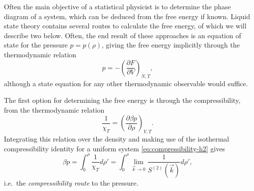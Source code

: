 Often the main objective of a statistical physicist is to determine the phase diagram of a system, which can be deduced from the free energy if known.
Liquid state theory contains several routes to calculate the free energy, of which we will describe two below.
Often, the end result of these approaches is an equation of state for the pressure $p = p(\rho)$, giving the free energy implicitly through the thermodynamic relation
\begin{equation}\label{eq:pressure-relation-1}
  p
  =
  - \left( \frac{\partial F}{\partial V} \right)_{N,T},
\end{equation}
although a state equation for any other thermodynamic observable would suffice.

The first option for determining the free energy is through the compressibility, from the thermodynamic relation
\begin{equation}
  \frac{1}{\chi_T}
  =
  \left( \frac{\partial \beta p}{\partial \rho} \right)_{V,T}.
\end{equation}
Integrating this relation over the density and making use of the isothermal compressibility identity for a uniform system \eqref{eq:compressibility-h2} gives
\begin{equation}\label{eq:compressibility-route-pressure}
  \beta p
  =
  \int_0^\rho \frac{1}{\chi_T} d\rho'
  =
  \int_0^\rho \lim_{\vec{k} \to 0} \frac{1}{S^{(2)}(\vec{k})} d\rho',
\end{equation}
i.e.\ the \emph{compressibility route} to the pressure.

